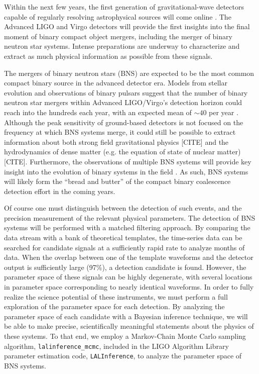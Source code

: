\documentclass[11pt,a4paper]{emulateapj}
\newcommand{\carl}[1]{{\color{red}  #1}}
\begin{document}
Within the next few
 years, the first generation of gravitational-wave detectors capable 
 of regularly resolving astrophysical sources will come online \citep{AdvLIGO,AdvVirgo}.
 The Advanced LIGO and Virgo detectors will provide the first insights
 into the final moment of binary compact object mergers, including the 
 merger of binary neutron star systems.  Intense preparations are underway
 to characterize and extract as much physical 
 information as possible from these signals.
 
The mergers of binary neutron stars (BNS) are expected to be the most common
compact binary source in the advanced detector era.   Models from stellar 
evolution and observations of binary pulsars suggest that the number of binary neutron star mergers within 
Advanced LIGO/Virgo's detection horizon could reach into the hundreds each 
year, with an expected mean of $\sim 40$ per year \citep{RatesPaper}. 
Although the peak sensitivity of ground-based detectors
is not focused on the frequency at which BNS systems merge, it could still
be possible to extract information about both strong field gravitational 
physics \carl{[CITE]} and the hydrodynamics of dense matter (e.g. the equation 
of state of nuclear matter) \carl{[CITE]}.  Furthermore, the observations of multiple BNS
systems will provide key insight into the evolution of binary systems in the field \citep{VickyRates,KimRates}
. As such, BNS systems will likely 
form the ``bread and butter'' of the compact binary coalescence detection effort in the coming 
years.


Of course one must distinguish between the detection of 
such events, and the precision measurement of the relevant physical parameters.
The detection of BNS systems will be performed with a matched filtering approach.  
By comparing the data stream with a bank of theoretical templates, the 
 time-series data can be searched for candidate signals at a sufficiently
  rapid rate to analyze months of data.  When the overlap between one of the template waveforms and the 
detector output is sufficiently large (97\%), a detection candidate is found.  However,
the parameter space of these signals can be highly degenerate, with several 
locations in parameter space corresponding to nearly identical waveforms.  In 
order to fully realize the science potential of these instruments, we must 
perform a full exploration of the parameter space for each detection.  By 
analyzing the parameter space of each candidate with a Bayesian inference technique, 
 we will be able to make precise, scientifically meaningful
statements about the physics of these systems.  To 
that end, we employ a Markov-Chain Monte Carlo sampling algorithm, 
\texttt{lalinference\_mcmc}, included in the LIGO Algorithm Library parameter
estimation code, \texttt{LALInference}, to analyze the parameter space of BNS systems.
\end{document}
